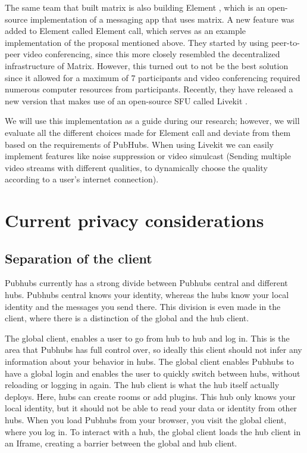 \documentclass{report}
\begin{document}
The same team that built matrix is also building Element \cite{ELEMENT}, which is an open-source implementation of a messaging app that uses matrix. A new feature was added to Element called Element call, which serves as an example implementation of the proposal mentioned above. They started by using peer-to-peer video conferencing, since this more closely resembled the decentralized infrastructure of Matrix. However, this turned out to not be the best solution since it allowed for a maximum of 7 participants and video conferencing required numerous computer resources from participants. Recently, they have released a new version that makes use of an open-source SFU called Livekit \cite{LIVEKIT}.

We will use this implementation as a guide during our research; however, we will evaluate all the different choices made for Element call and deviate from them based on the requirements of PubHubs. When using Livekit we can easily implement features like noise suppression or video simulcast (Sending multiple video streams with different qualities, to dynamically choose the quality according to a user's internet connection).

\chapter{Current privacy considerations}
\section{Separation of the client}
Pubhubs currently has  a strong divide between Pubhubs central and different hubs. Pubhubs central knows your identity, whereas the hubs know your local identity and the messages you send there. This division is even made in the client, where there is a distinction of the global and the hub client. 

The global client, enables a user to go from hub to hub and log in. This is the area that Pubhubs has full control over, so ideally this client should not infer any information about your behavior in hubs. The global client enables Pubhubs to have a global login and enables the user to quickly switch between hubs, without reloading or logging in again. The hub client is what the hub itself actually deploys. Here, hubs can create rooms or add plugins. This hub only knows your local identity, but it should not be able to read your data or identity from other hubs. When you load Pubhubs from your browser, you visit the global client, where you log in. To interact with a hub, the global client loads the hub client in an Iframe, creating a barrier between the global and hub client. 
\end{document}
